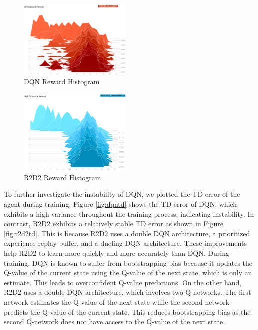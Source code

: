 \documentclass[conference]{IEEEtran}
\begin{document}
\begin{figure}[t!]
    \centering
    \includegraphics[width=0.48\textwidth, height=0.35\textwidth]{figures/DQN_Reward.png}
    \caption{DQN Reward Histogram}
    \label{fig:dqnr}
\end{figure}

\begin{figure}[t!]
    \centering
    \includegraphics[width=0.48\textwidth, height=0.35\textwidth]{figures/R2D2_Reward.png}
    \caption{R2D2 Reward Histogram}
    \label{fig:r2d2r}
\end{figure}

To further investigate the instability of DQN, we plotted the TD error of the agent during training. Figure \ref{fig:dqntd} shows the TD error of DQN, which exhibits a high variance throughout the training process, indicating instability. In contrast, R2D2 exhibits a relatively stable TD error as shown in Figure \ref{fig:r2d2td}. This is because R2D2 uses a double DQN architecture, a prioritized experience replay buffer, and a dueling DQN architecture. These improvements help R2D2 to learn more quickly and more accurately than DQN. During training, DQN is known to suffer from bootstrapping bias because it updates the Q-value of the current state using the Q-value of the next state, which is only an estimate. This leads to overconfident Q-value predictions. On the other hand, R2D2 uses a double DQN architecture, which involves two Q-networks. The first network estimates the Q-value of the next state while the second network predicts the Q-value of the current state. This reduces bootstrapping bias as the second Q-network does not have access to the Q-value of the next state.
\end{document}

